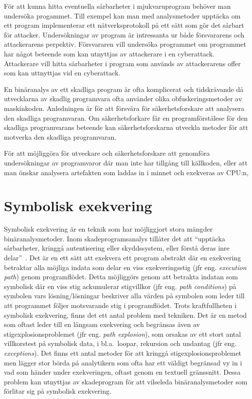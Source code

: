 För att kunna hitta eventuella sårbarheter i mjukvaruprogram behöver man undersöka progammet.
Till exempel kan man med analysmetoder upptäcka om ett program implementerar ett nätverksprotokoll på ett sätt som gör det sårbart för attacker.
Undersökningar av program är intressanta ur både försvararens och attackerarens perpektiv.
Försvararen vill undersöka programmet om programmet har något beteende som kan utnyttjas av attackerare i en cyberattack.
Attackerare vill hitta sårbarheter i program som används av attackerarens offer som kan uttnyttjas vid en cyberattack.

En binäranalys av ett skadliga program är ofta komplicerat och tidskrävande då utvecklarna av skadlig programvara ofta använder olika obfuskeringsmetoder av maskinkoden.
Anledningen är för att försvåra för säkerhetsforskare att analysera den skadliga programvaran.
Om säkerhetsforkare får en programförstålese för den skadliga programvarans beteende kan säkerhetsforskarna utveckla metoder för att motverka den skadliga programvaran.

För att möjliggöra för utveckare och säkerhetsforskare att genomföra undersökningar av programvaror där man inte har tillgång till källkoden, eller att man önskar analysera artefakten som laddas in i minnet och exekveras av CPU:n,

\section{Symbolisk exekvering}

Symbolisk exekvering är en teknik som har möjliggjort stora mängder binäranalysmetoder\cite{survey_symb_exc, symnav}.
Inom skadeprogramsanalys tillåter det att ``upptäcka sårbarheter, kringgå autentisering eller skyddssystem, eller förstå deras inre delar''~\cite{symnav}.
Det är en ett sätt att exekvera ett program abstrakt där en exekvering betraktar alla möjliga indata som delar en viss exekveringsstig (jfr eng. \emph{execution path}) genom programflödet.
Detta möjliggörs genom att betrakta indatan som symbolisk där en viss stig ackumulerar stigvillkor (jfr eng. \emph{path conditions}) på symbolen vars lösning/lösningar beskriver alla värden på symbolen som leder till att programmet följer motsvarande stig i programflödet.
Trots kraftfullheten i symbolisk exekvering, finns det ett antal problem med tekniken.
Det är en metod som oftast leder till en långsam exekvering och begränsas även av stigexplosionsproblemet (jfr eng. \emph{path explosion}), som orsakas av ett stort antal villkorstest på symbolisk data, i bl.a.\ loopar, rekursion och undantag (jfr eng. \emph{exceptions}).
Det finns ett antal metoder för att kringgå stigexplosionsproblemet men lägger stor börda på analytikern som ofta har ett väldigt begränsad vy in i vad som händer under exekveringen, oftast genom en textuell gränssnitt.
Dessa problem kan utnyttjas av skadeprogram för att vilseleda binäranalysmetoder som förlitar sig på symbolisk exekvering.

